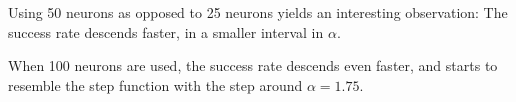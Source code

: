 Using 50 neurons as opposed to 25 neurons yields an interesting observation:
The success rate descends faster, in a smaller interval in \(\alpha\).

When 100 neurons are used, the success rate descends even faster, and starts to resemble the step function with the step around \(\alpha = 1.75\).
